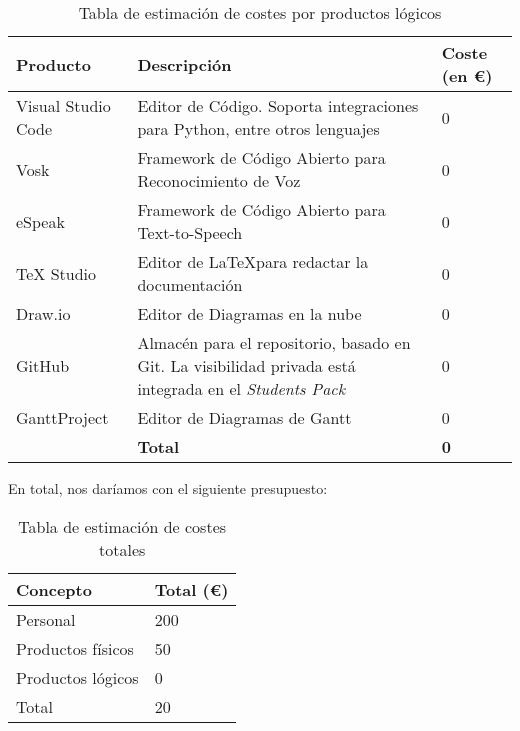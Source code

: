 \begin{center}
	\begin{table}[H]
		\centering
		\begin{tabularx}{\textwidth}{|l|X|X|}
			\hline
			\cellcolor{lightblue}\textbf{Producto} & \cellcolor{lightblue}\textbf{Descripción} & \cellcolor{lightblue}\textbf{Coste (en €)} \\
			\hline
			Visual Studio Code & Editor de Código. Soporta integraciones para Python, entre otros lenguajes & 0 \\
			\hline
			Vosk & Framework de Código Abierto para Reconocimiento de Voz & 0 \\
			\hline
			eSpeak & Framework de Código Abierto para Text-to-Speech & 0 \\
			\hline
			TeX Studio & Editor de \LaTeX  para redactar la documentación & 0 \\
			\hline
			Draw.io & Editor de Diagramas en la nube & 0 \\
			\hline
			GitHub & Almacén para el repositorio, basado en Git. La visibilidad privada está integrada en el \textit{Students Pack} & 0 \\
			\hline
			GanttProject & Editor de Diagramas de Gantt & 0 \\
			\hline
			& \textbf{Total} & \textbf{0} \\
			\hline
		\end{tabularx}
		\caption{Tabla de estimación de costes por productos lógicos}
	\end{table}
\end{center}

En total, nos daríamos con el siguiente presupuesto:

\begin{center}
	\begin{table}[H]
		\centering
		\begin{tabularx}{10cm}{|X|X|}
			\hline
			\cellcolor{lightblue}\textbf{Concepto} & \cellcolor{lightblue}\textbf{Total (€)}  \\
			\hline
			Personal & 200 \\
			\hline
			Productos físicos & 50 \\
			\hline
			Productos lógicos & 0\\
			\hline
			Total & 20\\
			\hline
		\end{tabularx}
		\caption{Tabla de estimación de costes totales}
	\end{table}
\end{center}


